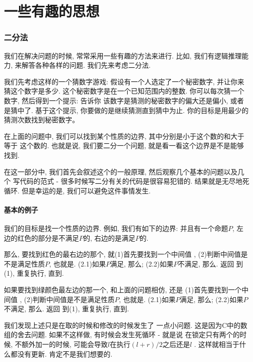 \part{一些有趣的思想}

\section{二分法}

我们在解决问题的时候, 常常采用一些有趣的方法来进行. 比如, 我们有逻辑推理能力, 
来解答各种各样的问题. 我们先来考虑二分法. 

我们先考虑这样的一个猜数字游戏: 假设有一个人选定了一个秘密数字, 并让你来猜这个数字是多少.
这个秘密数字是在一个已知范围内的整数. 你可以每次猜一个数字, 然后得到一个提示: 告诉你
该数字是猜测的秘密数字的偏大还是偏小, 或者是猜中了. 
基于这个提示, 你要做的是继续猜测直到猜中为止. 你的目标是用最少的猜测次数找到秘密数字。

在上面的问题中, 我们可以找到某个性质的边界, 其中分别是小于这个数的和大于等于
这个数的. 也就是说, 我们要二分一个问题, 就是看一看这个边界是不是能够找到. 

在这一部分中, 我们首先会叙述这个的一般原理, 然后观察几个基本的问题以及几个
写代码的范式 - 很多时候写二分有关的代码是很容易犯错的. 结果就是无尽地死循环.
但是幸运的是, 我们可以避免这件事情发生. 

\subsection{基本的例子}

 我们的目标是找一个性质的边界. 例如, 我们有如下的边界: 
并且有一个命题$P$, 左边的红色的部分是不满足$P$的, 右边的是满足$P$的. 

那么, 要找到红色的最右边的那个, 就(1)首先要找到一个中间值
, (2)判断中间值是不是满足性质$P$, 也就是. (2.1)如果$P$满足, 
那么; (2.2)如果$P$不满足, 那么. 返回
到(1), 重复执行, 直到. 

如果要找到绿颜色最左边的那一个, 和上面的问题相仿, 还是
(1)首先要找到一个中间值
, (2)判断中间值是不是满足性质$P$, 也就是. (2.1)如果$P$满足, 
那么; (2.2)如果$P$不满足, 那么. 返回
到(1), 重复执行, 直到. 

我们发现上述只是在取的时候和修改的时候发生了
一点小问题. 这是因为C中的数组的舍去问题. 如果不这样做, 有时候会发生死循环 - 就是说
在锁定只有两个的时候, 不额外加一的时候, 可能会导致$l$在执行$(l+r)/2$之后还是$l$
. 这样就相当于什么都没有更新. 肯定不是我们想要的. 

